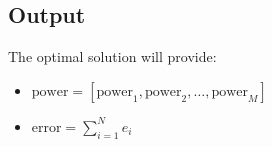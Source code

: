 \documentclass{article}
\begin{document}
\subsection*{Output}
The optimal solution will provide:
\begin{itemize}
    \item \( \text{power} = [\text{power}_1, \text{power}_2, \ldots, \text{power}_M] \)
    \item \( \text{error} = \sum_{i=1}^{N} e_i \)
\end{itemize}
\end{document}
